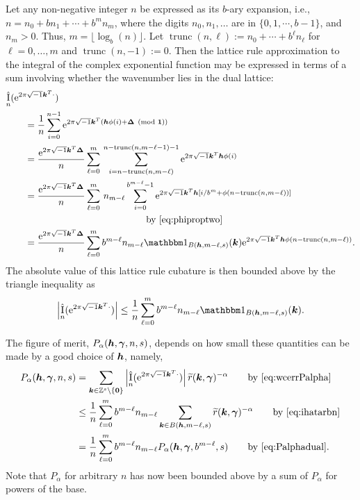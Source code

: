 \documentclass[authoryear]{elsarticle}
\newcommand{\tr}{\widetilde{r}}
\DeclareMathOperator{\appxint}{\hat{I}}
\DeclareMathOperator{\trun}{trunc}
\begin{document}
Let any non-negative integer $n$ be expressed as  its $b$-ary expansion, i.e., $n = n_0 + bn_1 + \cdots + b^m n_m$, where the digits $n_0, n_1, \ldots$ are in $\{0, 1, \cdots, b-1\}$, and $n_m > 0$. Thus, $m = \lfloor \log_b(n) \rfloor$.  Let $\trun(n,\ell) := n_0 + \cdots + b^{\ell} n_{\ell}$ for $\ell = 0, \ldots, m$ and $\trun(n,-1) := 0$.  Then the lattice rule approximation to the integral of the complex exponential function may be expressed in terms of a sum involving whether the wavenumber lies in the dual lattice:  
\begin{align*}
    \MoveEqLeft{\appxint_{n}(\me^{2 \pi \sqrt{-1} \vk^T \cdot}) } \\
    &= \frac 1{n} \sum_{i=0}^{n-1} \me^{2 \pi \sqrt{-1} \vk^T (\vh\phi(i) + \vDelta \pmod{\vone})} \\
    \nonumber
    &= \frac {\me^{2 \pi \sqrt{-1} \vk^T \vDelta}}{n} \sum_{\ell = 0}^{m} \,
    \sum_{i=n - \trun(n,m-\ell) }^{n - \trun(n,m-\ell-1)  -1} \me^{2 \pi \sqrt{-1} \vk^T \vh\phi(i)} \\
    &= \frac {\me^{2 \pi \sqrt{-1} \vk^T \vDelta}}{n} \sum_{\ell = 0}^{m} \, n_{m-\ell}
    \sum_{i=0 }^{b^{m-\ell}  -1} \me^{2 \pi \sqrt{-1} \vk^T \vh[i/b^m + \phi(n - \trun(n,m-\ell))]} \\
    & \hspace{30ex} \text{by \eqref{eq:phiproptwo}} \\
    & = \frac {\me^{2 \pi \sqrt{-1} \vk^T \vDelta}}{n} \sum_{\ell = 0}^{m} b^{m-\ell} n_{m - \ell} \bbone_{B(\vh,m-\ell,s)}(\vk) \me^{2 \pi \sqrt{-1} \vk^T \vh\phi(n - \trun(n,m-\ell))}.
\end{align*}
 The absolute value of this lattice rule cubature is then bounded above by the triangle inequality as 
\begin{equation} \label{eq:ihatarbn}
    \abs{\appxint_{n}(\me^{2 \pi \sqrt{-1} \vk^T \cdot})} \le \frac {1}{n} \sum_{\ell = 0}^{m} b^{m-\ell} n_{m - \ell} \bbone_{B(\vh,m-\ell, s)}(\vk).
\end{equation}

The figure of merit, $P_\alpha(\boldsymbol{h},\boldsymbol{\gamma},n,s)$, depends on how small these quantities can be made by a good choice of $\boldsymbol{h}$, namely,
\begin{align} \label{eq:Palphan}
      \nonumber
      P_\alpha(\vh,\vgamma,n,s) & = \sum_{\vk \in \integers^s \setminus\{\vzero\}} \abs{\appxint_n(\me^{2 \pi \sqrt{-1} \vk^T \cdot})}\tr(\vk,\vgamma)^{-\alpha} \qquad \text{by \eqref{eq:wcerrPalpha}} \\
      \nonumber
      & \le \frac {1}{n} \sum_{\ell = 0}^{m} b^{m-\ell} n_{m - \ell} \sum_{\vk \in B(\vh,m-\ell,s)} \tr(\vk,\vgamma)^{-\alpha}
      \qquad \text{by \eqref{eq:ihatarbn}}\\
      & = \frac {1}{n} \sum_{\ell = 0}^{m} b^{m-\ell} n_{m - \ell} P_\alpha(\vh,\vgamma,b^{m-\ell},s)
      \qquad \text{by \eqref{eq:Palphadual}}.
\end{align}
Note that $P_\alpha$ for arbitrary $n$ has now been bounded above by a sum of $P_\alpha$ for powers of the base.  
\end{document}
